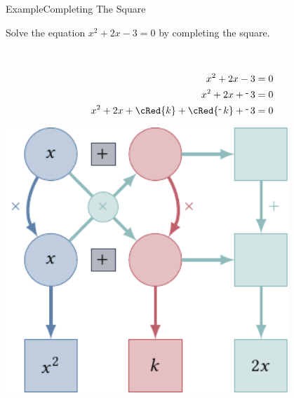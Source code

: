 \documentclass[aspectratio=169, sectionpages]{beamer}
\begin{document}
\begin{frame}{Example}{Completing The Square}

	\prob Solve the equation \( x^2 + 2x - 3 = 0 \) by completing the square.


	\framebreak
	\soln \hfill\\
	\begin{minipage}[t]{0.5\textwidth}
		\vspace{0pt}
		\begin{align*}
			x^2 + 2x - 3                                   & = 0 \\
			x^2 + 2x + \oneg 3                             & = 0 \\
			x^2 + 2x + \cRed{k} + \cRed{\oneg k} + \oneg 3 & = 0
		\end{align*}
	\end{minipage}
	\hspace{0.05\textwidth}
	\begin{minipage}[t]{0.4\textwidth}
		\vspace{0pt}
		\begin{center}
			\includegraphics[width=0.8\textwidth]{imgs.tikz.057w}
		\end{center}
	\end{minipage}
	\hfill


\end{frame}
\end{document}
